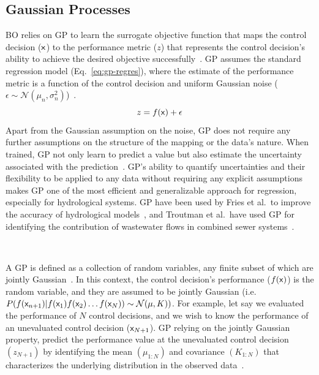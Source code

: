 \subsection{Gaussian Processes}\label{subsec:gp}
BO relies on GP to learn the surrogate objective function that maps the control decision (${\mathsf{x}}$) to the performance metric  ($z$) that represents the control decision's ability to achieve the desired objective successfully~\cite{frazier2018tutorial}. 
GP assumes the standard regression model (Eq.~\ref{eq:gp-regres}), where the estimate of the performance metric is a function of the control decision and uniform Gaussian noise ($\epsilon \sim \mathcal{N}(\mu_n, \sigma_n^2)$)~\citep{rasmussenGaussianProcessesMachine2006}.
\begin{equation}\label{eq:gp-regres}
	z = f({\mathsf{x}}) + \epsilon
\end{equation}
Apart from the Gaussian assumption on the noise, GP does not require any further assumptions on the structure of the mapping or the data's nature.
When trained, GP not only learn to predict a value but also estimate the uncertainty associated with the prediction~\cite{rasmussenGaussianProcessesMachine2006}.  
GP's ability to quantify uncertainties and their flexibility to be applied to any data without requiring any explicit assumptions makes GP one of the most efficient and generalizable approach for regression, especially for hydrological systems. 
GP have been used by Fries et al.\ to improve the accuracy of hydrological models~\cite{Fries_Kerkez_2017}, and Troutman et al.\ have used GP for identifying the contribution of wastewater flows in combined sewer systems~\cite{Troutman_Schambach_Love_Kerkez_2017}.

\

A GP is defined as a collection of random variables, any finite subset of which are jointly Gaussian~\cite{rasmussenGaussianProcessesMachine2006}.
In this context, the control decision's performance ($f({\mathsf{x}})$) is the random variable, and they are assumed to be jointly Gaussian (i.e.\ $P(f({\mathsf{x}}_{n+1})|f({\mathsf{x}}_1)f({\mathsf{x}}_2) \ldots f({\mathsf{x}}_{N})) \sim \mathcal{N}(\mu,K))$.
For example, let say we evaluated the performance of $N$ control decisions, and we wish to know the performance of an unevaluated control decision (${\mathsf{x}}_{N+1}$).
GP relying on the jointly Gaussian property, predict the performance value at the unevaluated control decision $(z_{N+1})$ by identifying the mean $(\mu_{1:N})$ and covariance $(K_{1:N})$ that characterizes the underlying distribution in the observed data~\cite{rasmussenGaussianProcessesMachine2006}.

